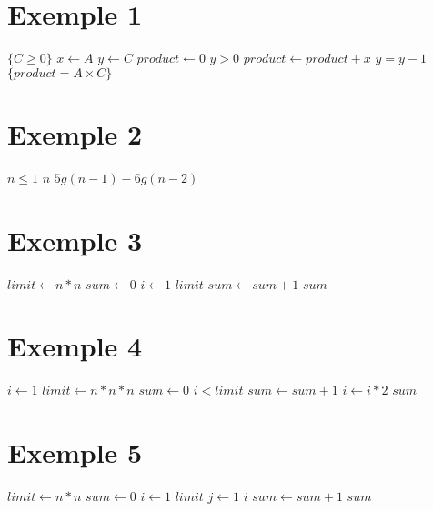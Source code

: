 \documentclass[a4paper,10pt]{article}
\begin{document}
\section*{Exemple 1}

\begin{codebox}
    \li \Comment $\{C \geq 0\}$
    \li $x \gets A$
    \li $y \gets C$
    \li $product\gets 0$
    \li \While $y > 0$
    \li \Do     $product\gets product + x$
    \li         $y = y - 1$
        \End
    \li \Comment $\{product = A \times C\}$
    \End
\end{codebox}
\vspace{10pt}

\section*{Exemple 2}
\begin{codebox}
    \li \If $n \leq 1$
    \li \Then \Return $n$
    \li \Else
    \li \Return $5 g(n-1) - 6 g(n-2)$
        \End
\end{codebox}
\vspace{10pt}

\section*{Exemple 3}
\begin{codebox}
    \li $limit\gets n*n$
    \li $sum\gets 0$
    \li \For $i\gets 1$ \To $limit$
    \li \Do $sum\gets sum+1$
        \End
    \li \Return $sum$
    \End
\end{codebox}
\vspace{10pt}

\section*{Exemple 4}
\begin{codebox}
    \li $i\gets 1$
    \li $limit\gets n*n*n$
    \li $sum\gets 0$
    \li \While $i < limit$
    \li \Do $sum\gets sum+1$
    \li     $i\gets i*2$
        \End
    \li \Return $sum$
    \End
\end{codebox}
\vspace{10pt}

\section*{Exemple 5}
\begin{codebox}
    \li $limit\gets n*n$
    \li $sum\gets 0$
    \li \For $i\gets 1$ \To $limit$
    \li \Do \For $j\gets 1$ \To $i$
    \li     \Do $sum\gets sum+1$
            \End
        \End
    \li \Return $sum$
    \End
\end{codebox}
\vspace{10pt}
\end{document}
